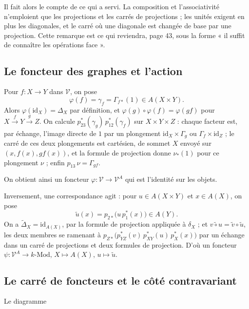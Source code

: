 \documentclass[11pt,a4paper]{article}
\begin{document}
Il fait alors le compte de ce qui a servi. La composition et l'associativité
n'emploient que les projections et les carrés de projections ; les unités
exigent en plus les diagonales, et le carré où une diagonale est changée de
base par une projection. Cette remarque est ce qui reviendra, page 43, sous la
forme « il suffit de connaître les opérations face ».

\subsection*{Le foncteur des graphes et l'action}

Pour $f \colon X \to Y$ dans $\mathcal{V}$, on pose
\[ \varphi(f) = \gamma_{f} = \Gamma_{f*}(1) \in A(X \times Y) . \]
Alors $\varphi(\mathrm{id}_{X}) = \Delta_{X}$ par définition, et
$\varphi(g) \circ \varphi(f) = \varphi(gf)$ pour
$X \xrightarrow{f} Y \xrightarrow{g} Z$. On calcule
$p_{23}^{*}(\gamma_{g})\, p_{12}^{*}(\gamma_{f})$ sur $X \times Y \times Z$ :
chaque facteur est, par échange, l'image directe de $1$ par un plongement
$\mathrm{id}_{X} \times \Gamma_{g}$ ou $\Gamma_{f} \times \mathrm{id}_{Z}$ ;
le carré de ces deux plongements est cartésien, de sommet $X$ envoyé sur
$(x, f(x), gf(x))$, et la formule de projection donne
$\nu_{*}(1)$ pour ce plongement $\nu$ ; enfin $p_{13}\, \nu = \Gamma_{gf}$.

On obtient ainsi un foncteur $\varphi \colon \mathcal{V} \to \mathcal{V}^{A}$
qui est l'identité sur les objets.

Inversement, une correspondance agit : pour $u \in A(X \times Y)$ et
$x \in A(X)$, on pose
\[ \tilde{u}(x) = p_{2*}\bigl( u\, p_{1}^{*}(x) \bigr) \in A(Y) . \]
On a $\tilde{\Delta}_{X} = \mathrm{id}_{A(X)}$, par la formule de projection
appliquée à $\delta_{X}$ ; et
$\widetilde{v \circ u} = \tilde{v} \circ \tilde{u}$, les deux membres se
ramenant à $p_{Z*}\bigl(p_{YZ}^{*}(v)\, p_{XY}^{*}(u)\, p_{X}^{*}(x)\bigr)$ par
un échange dans un carré de projections et deux formules de projection. D'où
un foncteur $\psi \colon \mathcal{V}^{A} \to k\text{-Mod}$, $X \mapsto A(X)$,
$u \mapsto \tilde{u}$.

\subsection*{Le carré de foncteurs et le côté contravariant}

Le diagramme

\end{document}
